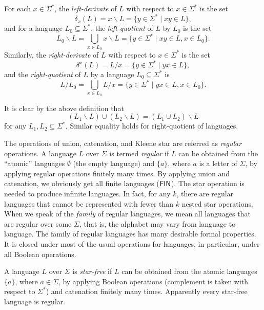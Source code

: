 For each $x \in \Sigma^*$, the \emph{left-derivate} of $L$ with respect to $x \in \Sigma^*$ is the set
$$\delta_x(L) = x \backslash L = \{y \in \Sigma^* \mid xy \in L\},$$
and for a language $L_0 \subseteq \Sigma^*$, the \emph{left-quotient} of $L$ by $L_0$ is the set
$$L_0 \backslash L = \bigcup_{x \in L_0} x \backslash L = \{y \in \Sigma^* \mid xy \in L, x \in L_0\}.$$
Similarly, the \emph{right-derivate} of $L$ with respect to $x \in \Sigma^*$ is the set
$$\delta^x(L) = L / x = \{y \in \Sigma^* \mid yx \in L\},$$
and the \emph{right-quotient} of $L$ by a language $L_0 \subseteq \Sigma^*$ is
$$L / L_0 = \bigcup_{x \in L_0} L / x = \{y \in \Sigma^* \mid yx \in L, x \in L_0\}.$$

It is clear by the above definition that
$$(L_1 \backslash L) \cup (L_2 \backslash L) = (L_1 \cup L_2) \backslash L$$
for any $L_1, L_2 \subseteq \Sigma^*$. Similar equality holds for right-quotient of languages.

The operations of union, catenation, and Kleene star are referred as \emph{regular} operations. A language $L$ over $\Sigma$ is termed \emph{regular} if $L$ can be obtained from the ``atomic'' languages $\emptyset$ (the  empty language) and $\{a\}$, where $a$ is a letter of $\Sigma$, by applying regular operations finitely many times. By applying union and catenation, we obviously get all finite languages \index{$\Fin$}($\Fin$). The star operation is needed to produce infinite languages. In fact, for any $k$, there are regular languages that cannot be represented with fewer than $k$ nested star operations. When we speak of the \emph{family} of regular languages, we mean all languages that are regular over some $\Sigma$, that is, the alphabet may vary from language to language. The family of regular languages has many desirable formal properties. It is closed under most of the usual operations for languages, in particular, under all Boolean operations.

A language $L$ over $\Sigma$ is \emph{star-free} if $L$ can be obtained from the atomic languages $\{a\}$, where $a \in \Sigma$, by applying Boolean operations (complement is taken with respect to $\Sigma^*$) and catenation finitely many times. Apparently every star-free language is regular.

